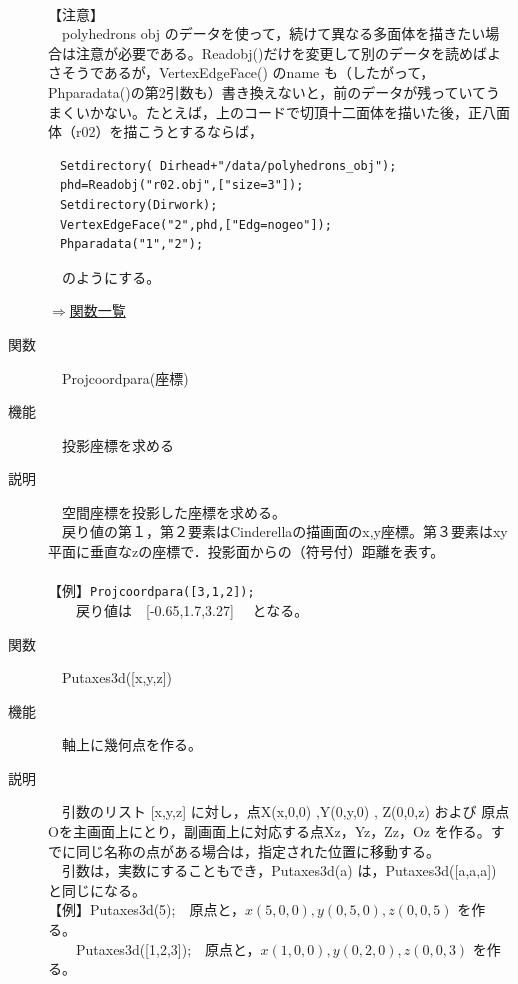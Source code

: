 \documentclass[papersize,a4paper,12pt,uplatex]{jsarticle}
\begin{document}
\begin{description}
　　　　　　\\

【注意】\\
　polyhedrons obj のデータを使って，続けて異なる多面体を描きたい場合は注意が必要である。Readobj()だけを変更して別のデータを読めばよさそうであるが，VertexEdgeFace() のname も（したがって，Phparadata()の第2引数も）書き換えないと，前のデータが残っていてうまくいかない。たとえば，上のコードで切頂十二面体を描いた後，正八面体（r02）を描こうとするならば，
\begin{verbatim}
　Setdirectory( Dirhead+"/data/polyhedrons_obj");
　phd=Readobj("r02.obj",["size=3"]);
　Setdirectory(Dirwork);
　VertexEdgeFace("2",phd,["Edg=nogeo"]);
　Phparadata("1","2");
\end{verbatim}
　のようにする。\\

\begin{flushright} \hyperlink{functionlist3d}{$\Rightarrow$関数一覧}\end{flushright}

\hypertarget{projcoordpara}{}
\item[関数]　Projcoordpara(座標)
\item[機能]　投影座標を求める
\item[説明]　空間座標を投影した座標を求める。\\
　戻り値の第１，第２要素はCinderellaの描画面のx,y座標。第３要素はxy平面に垂直なzの座標で．投影面からの（符号付）距離を表す。\\
　\\
【例】\verb|Projcoordpara([3,1,2]);|\\
　　戻り値は　[-0.65,1.7,3.27] 　となる。\\


\hypertarget{putaxes3d}{}
\item[関数]　Putaxes3d([x,y,z])
\item[機能]　軸上に幾何点を作る。
\item[説明]　引数のリスト [x,y,z] に対し，点X(x,0,0) ,Y(0,y,0) , Z(0,0,z) および 原点Oを主画面上にとり，副画面上に対応する点Xz，Yz，Zz，Oz を作る。すでに同じ名称の点がある場合は，指定された位置に移動する。\\
　引数は，実数にすることもでき，Putaxes3d(a) は，Putaxes3d([a,a,a]) と同じになる。\\
【例】Putaxes3d(5);　原点と，$x(5,0,0),y(0,5,0),z(0,0,5)$ を作る。\\
　　Putaxes3d([1,2,3]);　原点と，$x(1,0,0),y(0,2,0),z(0,0,3)$ を作る。\\


\end{description}
\end{document}
